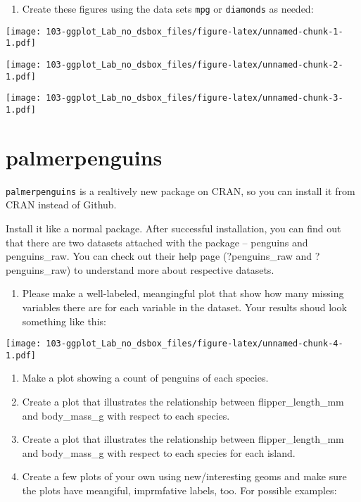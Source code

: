 \documentclass[
]{book}
\providecommand{\tightlist}{%
  \setlength{\itemsep}{0pt}\setlength{\parskip}{0pt}}
\begin{document}
\begin{enumerate}
\def\labelenumi{\arabic{enumi}.}
\tightlist
\item
  Create these figures using the data sets \texttt{mpg} or \texttt{diamonds} as needed:
\end{enumerate}

\texttt{[image: 103-ggplot\_Lab\_no\_dsbox\_files/figure-latex/unnamed-chunk-1-1.pdf]}

\texttt{[image: 103-ggplot\_Lab\_no\_dsbox\_files/figure-latex/unnamed-chunk-2-1.pdf]}

\texttt{[image: 103-ggplot\_Lab\_no\_dsbox\_files/figure-latex/unnamed-chunk-3-1.pdf]}

\hypertarget{palmerpenguins}{%
\section{palmerpenguins}\label{palmerpenguins}}

\texttt{palmerpenguins} is a realtively new package on CRAN, so you can install it from CRAN instead of Github.

Install it like a normal package. After successful installation, you can find out that there are two datasets attached with the package -- penguins and penguins\_raw. You can check out their help page (?penguins\_raw and ?penguins\_raw) to understand more about respective datasets.

\begin{enumerate}
\def\labelenumi{\arabic{enumi}.}
\tightlist
\item
  Please make a well-labeled, meangingful plot that show how many missing variables there are for each variable in the dataset. Your results shoud look something like this:
\end{enumerate}

\texttt{[image: 103-ggplot\_Lab\_no\_dsbox\_files/figure-latex/unnamed-chunk-4-1.pdf]}

\begin{enumerate}
\def\labelenumi{\arabic{enumi}.}
\setcounter{enumi}{1}
\item
  Make a plot showing a count of penguins of each species.
\item
  Create a plot that illustrates the relationship between flipper\_length\_mm and body\_mass\_g with respect to each species.
\item
  Create a plot that illustrates the relationship between flipper\_length\_mm and body\_mass\_g with respect to each species for each island.
\item
  Create a few plots of your own using new/interesting geoms and make sure the plots have meangiful, imprmfative labels, too. For possible examples:
\end{enumerate}
\end{document}
